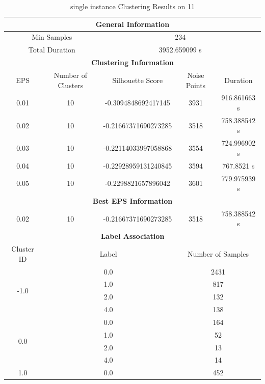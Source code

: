 \begin{longtable}{|c|c|c|c|c|}
\caption{single instance Clustering Results on 11} \label{tab:11_single_instance_clustering_results}\\
\hline
\multicolumn{5}{|c|}{\textbf{General Information}} \\
\hline
\multicolumn{2}{|c|}{Min Samples} & \multicolumn{3}{c|}{234} \\
\multicolumn{2}{|c|}{Total Duration} & \multicolumn{3}{c|}{3952.659099 s} \\
\hline
\multicolumn{5}{|c|}{\textbf{Clustering Information}} \\
\hline
EPS & Number of Clusters & Silhouette Score & Noise Points & Duration \\
0.01 & 10 & -0.3094848692417145 & 3931 & 916.861663 s\\
0.02 & 10 & -0.21667371690273285 & 3518 & 758.388542 s\\
0.03 & 10 & -0.22114033997058868 & 3554 & 724.996902 s\\
0.04 & 10 & -0.22928959131240845 & 3594 & 767.8521 s\\
0.05 & 10 & -0.2298821657896042 & 3601 & 779.975939 s\\
\hline
\multicolumn{5}{|c|}{\textbf{Best EPS Information}} \\
\hline
0.02 & 10 & -0.21667371690273285 & 3518 & 758.388542 s\\
\hline
\multicolumn{5}{|c|}{\textbf{Label Association}} \\
\hline
Cluster ID & \multicolumn{2}{c|}{Label} & \multicolumn{2}{c|}{Number of Samples} \\
\hline
\multirow{4}{*}{-1.0} & \multicolumn{2}{c|}{0.0} & \multicolumn{2}{c|}{2431} \\
& \multicolumn{2}{c|}{1.0} & \multicolumn{2}{c|}{817} \\
& \multicolumn{2}{c|}{2.0} & \multicolumn{2}{c|}{132} \\
& \multicolumn{2}{c|}{4.0} & \multicolumn{2}{c|}{138} \\
\hline
\multirow{4}{*}{0.0} & \multicolumn{2}{c|}{0.0} & \multicolumn{2}{c|}{164} \\
& \multicolumn{2}{c|}{1.0} & \multicolumn{2}{c|}{52} \\
& \multicolumn{2}{c|}{2.0} & \multicolumn{2}{c|}{13} \\
& \multicolumn{2}{c|}{4.0} & \multicolumn{2}{c|}{14} \\
\hline
\multirow{4}{*}{1.0} & \multicolumn{2}{c|}{0.0} & \multicolumn{2}{c|}{452} \\

\end{longtable}
